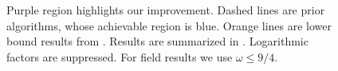 \begin{figure}[!ht]
{%
	}
	\endgroup
	\caption{Purple region highlights our improvement. Dashed lines are prior algorithms, whose achievable region is blue.
		Orange lines are lower bound results from \cite{gupta-korhonen-etal-2025-low-bandwidth-matrix}. Results are summarized in . Logarithmic factors are suppressed. For field results we use $\omega\le9/4$.}
	\label{fig:us-full-support-bounds}
\end{figure}

